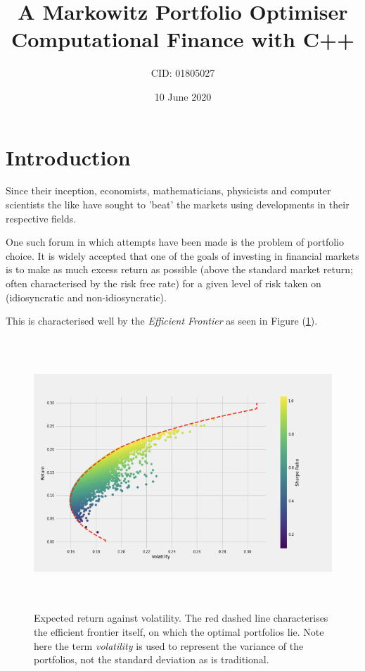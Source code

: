 \documentclass{article}
\title{%
	A Markowitz Portfolio Optimiser \\
	\large Computational Finance with C++ \\}
\author{CID: 01805027}
\date{10 June 2020}
\begin{document}
	
	
	
\renewcommand*{\arraystretch}{1.5}

\maketitle
\section{Introduction} 
\label{sec:introduction}

Since their inception, economists, mathematicians, physicists and computer scientists the like have sought to 'beat' the markets using developments in their respective fields.

One such forum in which attempts have been made is the problem of portfolio choice. It is widely accepted that one of the goals of investing in financial markets is to make as much excess return as possible (above the standard market return; often characterised by the risk free rate) for a given level of risk taken on (idiosyncratic and non-idiosyncratic). 

This is characterised well by the \textit{Efficient Frontier} as seen in Figure (\ref{efficient_frontier}).


\begin{figure}[H]
	\centerline{\includegraphics[width=\textwidth,height=4in]{Figures/EF.png}}
	\label{efficient_frontier}
	\caption{Expected return against volatility. The red dashed line characterises the efficient frontier itself, on which the optimal portfolios lie. \cite{ef_medium} Note here the term \textit{volatility} is used to represent the variance of the portfolios, not the standard deviation as is traditional.}
\end{figure}
\end{document}
